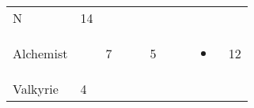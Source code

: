 \documentclass[12pt]{article}
\begin{document}
\begin{longtable}[]{@{}llllllllll@{}}
\begin{minipage}[t]{0.07\columnwidth}
N
\strut\end{minipage} &
\begin{minipage}[t]{0.08\columnwidth}\raggedright\strut
14
\strut\end{minipage}\tabularnewline
\begin{minipage}[t]{0.13\columnwidth}\raggedright\strut
Alchemist
\strut\end{minipage} &
\begin{minipage}[t]{0.06\columnwidth}\raggedright\strut
\strut\end{minipage} &
\begin{minipage}[t]{0.06\columnwidth}\raggedright\strut
7
\strut\end{minipage} &
\begin{minipage}[t]{0.06\columnwidth}\raggedright\strut
\strut\end{minipage} &
\begin{minipage}[t]{0.06\columnwidth}\raggedright\strut
\strut\end{minipage} &
\begin{minipage}[t]{0.06\columnwidth}\raggedright\strut
5
\strut\end{minipage} &
\begin{minipage}[t]{0.06\columnwidth}\raggedright\strut
\strut\end{minipage} &
\begin{minipage}[t]{0.06\columnwidth}\raggedright\strut
\strut\end{minipage} &
\begin{minipage}[t]{0.07\columnwidth}\raggedright\strut
\begin{itemize}
\item
\end{itemize}
\strut\end{minipage} &
\begin{minipage}[t]{0.08\columnwidth}\raggedright\strut
12
\strut\end{minipage}\tabularnewline
\begin{minipage}[t]{0.13\columnwidth}\raggedright\strut
Valkyrie
\strut\end{minipage} &
\begin{minipage}[t]{0.06\columnwidth}\raggedright\strut
4
\strut\end{minipage} &
\begin{minipage}[t]{0.06\columnwidth}\raggedright\strut
\strut\end{minipage} &
\begin{minipage}[t]{0.06\columnwidth}\raggedright\strut

\end{minipage}
\end{longtable}
\end{document}

